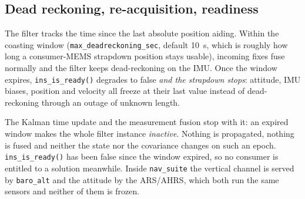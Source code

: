 \documentclass[11pt,a4paper]{article}
\newcommand{\code}[1]{\texttt{#1}}
\begin{document}
\subsection{Dead reckoning, re-acquisition, readiness}
\label{sec:readiness}

The filter tracks the time since the last absolute position aiding.
Within the coasting window (\code{max\_\allowbreak{}deadreckoning\_\allowbreak{}sec}, default
\SI{10}{\second}, which is roughly how long a consumer-MEMS strapdown position
stays usable), incoming fixes fuse normally and the filter keeps
dead-reckoning on the IMU. Once the window expires,
\code{ins\_\allowbreak{}is\_\allowbreak{}ready()} degrades to false \emph{and the strapdown
stops}: attitude, IMU biases, position and velocity all freeze at their
last value instead of dead-reckoning through an outage of unknown
length.

The Kalman time update and the measurement fusion stop with it: an expired
window makes the whole filter instance \emph{inactive}. Nothing is propagated,
nothing is fused and neither the state nor the covariance changes on such an
epoch. \code{ins\_\allowbreak{}is\_\allowbreak{}ready()} has been false since the window expired, so no
consumer is entitled to a solution meanwhile. Inside \code{nav\_\allowbreak{}suite} the
vertical channel is served by \code{baro\_\allowbreak{}alt} and the attitude by the ARS/AHRS,
which both run the same sensors and neither of them is frozen.
\end{document}
